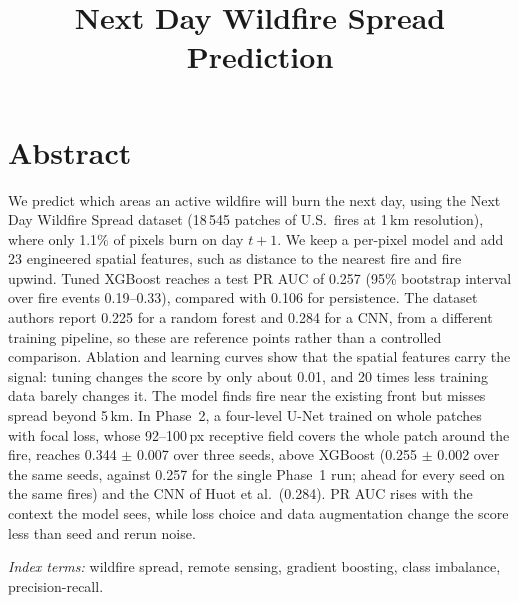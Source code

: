\documentclass[conference]{IEEEtran}
\begin{document}
\title{Next Day Wildfire Spread Prediction}

\author{
}

\maketitle
\thispagestyle{plain}
\pagestyle{plain}

\section*{Abstract}
We predict which areas an active wildfire will burn the next day, using the Next Day Wildfire Spread
dataset (18\,545 patches of U.S.\ fires at 1\,km resolution), where only 1.1\% of pixels burn on day $t+1$. We
keep a per-pixel model and add 23 engineered spatial features, such as distance to the nearest fire and
fire upwind. Tuned XGBoost reaches a test PR AUC of 0.257 (95\% bootstrap interval over fire events 0.19--0.33),
compared with 0.106 for persistence. The
dataset authors report 0.225 for a random forest and 0.284 for a CNN, from a different training pipeline,
so these are reference points rather than a controlled comparison. Ablation and learning curves show that the
spatial features carry the signal: tuning changes the score by only about 0.01, and 20 times less training
data barely changes it. The model finds fire near the
existing front but misses spread beyond 5\,km. In Phase~2, a four-level U-Net trained on whole patches
with focal loss, whose 92--100\,px receptive field covers the whole patch around the fire, reaches 0.344 $\pm$ 0.007 over three seeds,
above XGBoost (0.255 $\pm$ 0.002 over the same seeds, against 0.257 for the single Phase~1 run; ahead for every seed on the same fires) and the CNN of Huot et al.\ (0.284). PR AUC rises with the context the model sees, while loss choice and data augmentation
change the score less than seed and rerun noise.

\noindent\textit{Index terms:} wildfire spread, remote sensing, gradient boosting, class imbalance,
precision-recall.



















\end{document}
